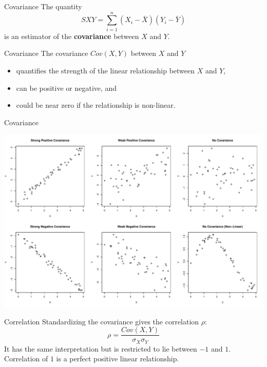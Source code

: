 \documentclass[handout]{beamer}
\begin{document}
\begin{frame}{Covariance}
    The quantity 
    \begin{equation*}
        SXY = \sum_{i=1}^n (X_i - \bar{X})(Y_i - \bar{Y})
    \end{equation*}
    is an estimator of the \textbf{covariance} between $X$ and $Y$.
\end{frame}

\begin{frame}{Covariance}
    The covariance $Cov(X, Y)$ between $X$ and $Y$ 
    \begin{itemize}
        \item quantifies the strength of the linear relationship between $X$ and $Y$,
        \item can be positive or negative, and
        \item could be near zero if the relationship is non-linear.
    \end{itemize}
\end{frame}

\begin{frame}{Covariance}
    \begin{center}
        \includegraphics[width=\linewidth]{figures/covariance.pdf}
    \end{center}
\end{frame}

\begin{frame}{Correlation}
    Standardizing the covariance gives the correlation $\rho$:
    \begin{equation*}
        \rho = \frac{Cov(X, Y)}{\sigma_X \sigma_Y}
    \end{equation*} 
    It has the same interpretation but is restricted to lie between $-1$ and $1$. Correlation of $1$ is a perfect positive linear relationship.
\end{frame}
\end{document}
